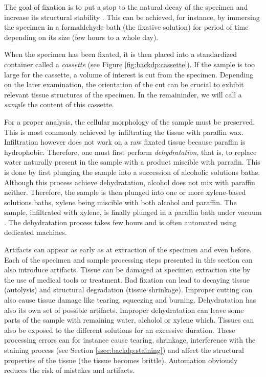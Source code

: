 The goal of fixation is to put a stop to the natural decay of the specimen and increase its structural stability \parencite{rolls2012process}. This can be achieved, for instance, by immersing the specimen in a formaldehyde bath (\ie the fixative solution) for period of time depending on its size (\ie few hours to a whole day). 

When the specimen has been fixated, it is then placed into a standardized container called a \textit{cassette} (see Figure \ref{fig:backdp:cassette}). If the sample is too large for the cassette, a volume of interest is cut from the specimen. Depending on the later examination, the orientation of the cut can be crucial to exhibit relevant tissue structures of the specimen. In the remaininder, we will call a \textit{sample} the content of this cassette.

For a proper analysis, the cellular morphology of the sample must be preserved. This is most commonly achieved by infiltrating the tissue with paraffin wax. Infiltration however does not work on a raw fixated tissue because paraffin is hydrophobic. Therefore, one must first perform \textit{dehydratation}, that is, to replace water naturally present in the sample with a product miscible with parrafin. This is done by first plunging the sample into a succession of alcoholic solutions baths. Although this process achieve dehydratation, alcohol does not mix with paraffin neither. Therefore, the sample is then plunged into one or more xylene-based solutions baths, xylene being miscible with both alcohol and paraffin. The sample, infiltrated with xylene, is finally plunged in a paraffin bath under vacuum . The dehydratation process takes few hours and is often automated using dedicated machines.  

Artifacts can appear as early as at extraction of the specimen and even before. Each of the specimen and sample processing steps presented in this section can also introduce artifacts. Tissue can be damaged at specimen extraction site by the use of medical tools or treatment. Bad fixation can lead to decaying tissue (\ie autolysis) and structural degradation (\eg tissue shrinkage). Improper cutting can also cause tissue damage like tearing, squeezing and burning. Dehydratation has also its own set of possible artifacts. Improper dehydratation can leave some parts of the sample with remaining water, alcholol or xylene which. Tissues can also be exposed to the different solutions for an excessive duration. These processing errors can for instance cause tearing, shrinkage, interference with the staining process (see Section \ref{ssec:backdp:staining}) and affect the structural properties of the tissue (\eg the tissue becomes brittle). Automation obviously reduces the risk of mistakes and artifacts.

